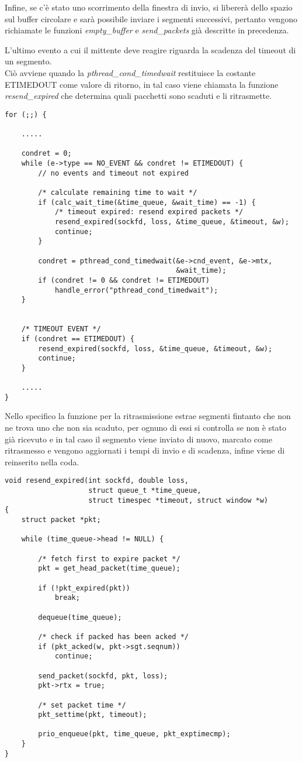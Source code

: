 Infine, se c'è stato uno scorrimento della finestra di invio, si libererà
dello spazio sul buffer circolare e sarà possibile 
inviare i segmenti successivi, pertanto vengono richiamate le funzioni
\emph{empty\_buffer} e \emph{send\_packets} già descritte in precedenza.

L'ultimo evento a cui il mittente deve reagire riguarda la scadenza del 
timeout di un segmento.\\
Ciò avviene quando la \emph{pthread\_cond\_timedwait} restituisce la 
costante ETIMEDOUT come valore di ritorno, in tal caso viene chiamata
la funzione \emph{resend\_expired} che determina quali pacchetti sono 
scaduti e li ritrasmette.
\begin{lstlisting}[title=window.c]
for (;;) {

    .....

	condret = 0;
	while (e->type == NO_EVENT && condret != ETIMEDOUT) {
		// no events and timeout not expired

		/* calculate remaining time to wait */
		if (calc_wait_time(&time_queue, &wait_time) == -1) {
			/* timeout expired: resend expired packets */
			resend_expired(sockfd, loss, &time_queue, &timeout, &w);
			continue;
		}

		condret = pthread_cond_timedwait(&e->cnd_event, &e->mtx,
                                         &wait_time);
		if (condret != 0 && condret != ETIMEDOUT)
			handle_error("pthread_cond_timedwait");
	}


	/* TIMEOUT EVENT */
	if (condret == ETIMEDOUT) {
		resend_expired(sockfd, loss, &time_queue, &timeout, &w);
		continue;
	}

    .....
}
\end{lstlisting}
Nello specifico la funzione per la ritrasmissione estrae segmenti fintanto
che non ne trova uno che non sia scaduto, per ognuno di essi si controlla 
se non è stato già ricevuto e in tal caso il segmento viene inviato di
nuovo, marcato come ritrasmesso e vengono aggiornati i tempi di invio e di
scadenza, infine viene di reinserito nella coda.
\begin{lstlisting}[title=transport.c]
void resend_expired(int sockfd, double loss, 
                    struct queue_t *time_queue,
                    struct timespec *timeout, struct window *w)
{
    struct packet *pkt;

    while (time_queue->head != NULL) {

        /* fetch first to expire packet */
        pkt = get_head_packet(time_queue);

        if (!pkt_expired(pkt))
            break;

        dequeue(time_queue);

        /* check if packed has been acked */
        if (pkt_acked(w, pkt->sgt.seqnum))
            continue;

        send_packet(sockfd, pkt, loss);
        pkt->rtx = true;

        /* set packet time */
        pkt_settime(pkt, timeout);

        prio_enqueue(pkt, time_queue, pkt_exptimecmp);
    }
}
\end{lstlisting}
